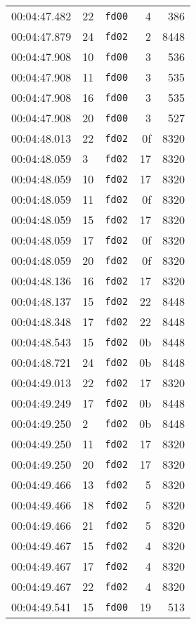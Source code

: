 \documentclass{article}
\begin{document}
\begin{longtable}{lllrr}
00:04:47.482 & 22 & \texttt{fd00} & 4 & 386 \\
00:04:47.879 & 24 & \texttt{fd02} & 2 & 8448 \\
00:04:47.908 & 10 & \texttt{fd00} & 3 & 536 \\
00:04:47.908 & 11 & \texttt{fd00} & 3 & 535 \\
00:04:47.908 & 16 & \texttt{fd00} & 3 & 535 \\
00:04:47.908 & 20 & \texttt{fd00} & 3 & 527 \\
00:04:48.013 & 22 & \texttt{fd02} & 0f & 8320 \\
00:04:48.059 & 3 & \texttt{fd02} & 17 & 8320 \\
00:04:48.059 & 10 & \texttt{fd02} & 17 & 8320 \\
00:04:48.059 & 11 & \texttt{fd02} & 0f & 8320 \\
00:04:48.059 & 15 & \texttt{fd02} & 17 & 8320 \\
00:04:48.059 & 17 & \texttt{fd02} & 0f & 8320 \\
00:04:48.059 & 20 & \texttt{fd02} & 0f & 8320 \\
00:04:48.136 & 16 & \texttt{fd02} & 17 & 8320 \\
00:04:48.137 & 15 & \texttt{fd02} & 22 & 8448 \\
00:04:48.348 & 17 & \texttt{fd02} & 22 & 8448 \\
00:04:48.543 & 15 & \texttt{fd02} & 0b & 8448 \\
00:04:48.721 & 24 & \texttt{fd02} & 0b & 8448 \\
00:04:49.013 & 22 & \texttt{fd02} & 17 & 8320 \\
00:04:49.249 & 17 & \texttt{fd02} & 0b & 8448 \\
00:04:49.250 & 2 & \texttt{fd02} & 0b & 8448 \\
00:04:49.250 & 11 & \texttt{fd02} & 17 & 8320 \\
00:04:49.250 & 20 & \texttt{fd02} & 17 & 8320 \\
00:04:49.466 & 13 & \texttt{fd02} & 5 & 8320 \\
00:04:49.466 & 18 & \texttt{fd02} & 5 & 8320 \\
00:04:49.466 & 21 & \texttt{fd02} & 5 & 8320 \\
00:04:49.467 & 15 & \texttt{fd02} & 4 & 8320 \\
00:04:49.467 & 17 & \texttt{fd02} & 4 & 8320 \\
00:04:49.467 & 22 & \texttt{fd02} & 4 & 8320 \\
00:04:49.541 & 15 & \texttt{fd00} & 19 & 513 \\

\end{longtable}
\end{document}
